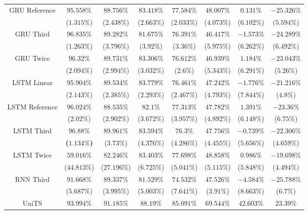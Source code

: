 \begin{table}[!ht]
{\begin{tabular}{|c|c|c|c|c|c|c|c|}
			\multirow{2}{*}{GRU Reference} & $95.558\%$ & $88.756\%$ & $83.418\%$ & $77.584\%$ & $48.007\%$ & $0.131\%$ & $-25.326\%$ \\
			 & ($1.315\%$) & ($2.438\%$) & ($2.663\%$) & ($2.033\%$) & ($4.073\%$) & ($6.102\%$) & ($5.594\%$) \\ \hline
			\multirow{2}{*}{GRU Third} & $96.835\%$ & $89.282\%$ & $81.675\%$ & $76.391\%$ & $46.417\%$ & $-1.573\%$ & $-24.289\%$ \\
			 & ($1.263\%$) & ($3.796\%$) & ($3.92\%$) & ($3.36\%$) & ($5.975\%$) & ($6.262\%$) & ($6.492\%$) \\ \hline
			\multirow{2}{*}{GRU Twice} & $96.32\%$ & $89.731\%$ & $83.306\%$ & $76.612\%$ & $46.939\%$ & $1.184\%$ & $-23.043\%$ \\
			 & ($2.094\%$) & ($2.994\%$) & ($3.032\%$) & ($2.6\%$) & ($5.343\%$) & ($6.291\%$) & ($5.26\%$) \\ \hline
			\multirow{2}{*}{LSTM Linear} & $95.904\%$ & $89.534\%$ & $83.779\%$ & $76.461\%$ & $47.242\%$ & $-1.776\%$ & $-21.216\%$ \\
			 & ($2.143\%$) & ($2.385\%$) & ($2.293\%$) & ($2.467\%$) & ($4.793\%$) & ($7.844\%$) & ($4.8\%$) \\ \hline
			\multirow{2}{*}{LSTM Reference} & $96.024\%$ & $88.535\%$ & $82.1\%$ & $77.313\%$ & $47.782\%$ & $1.391\%$ & $-23.36\%$ \\
			 & ($2.02\%$) & ($2.902\%$) & ($3.672\%$) & ($3.957\%$) & ($4.892\%$) & ($6.148\%$) & ($6.75\%$) \\ \hline
			\multirow{2}{*}{LSTM Third} & $\mathbf{96.88\%}$ & $89.961\%$ & $83.594\%$ & $76.3\%$ & $47.756\%$ & $-0.739\%$ & $-22.306\%$ \\
			 & \textbf{(}$\mathbf{1.134\%}$\textbf{)} & ($3.73\%$) & ($4.376\%$) & ($4.286\%$) & ($4.455\%$) & ($5.656\%$) & ($4.659\%$) \\ \hline
			\multirow{2}{*}{LSTM Twice} & $59.016\%$ & $82.246\%$ & $83.403\%$ & $77.698\%$ & $48.858\%$ & $0.986\%$ & $-19.698\%$ \\
			 & ($44.813\%$) & ($27.196\%$) & ($6.725\%$) & ($5.041\%$) & ($5.115\%$) & ($5.848\%$) & ($4.494\%$) \\ \hline
			\multirow{2}{*}{RNN Third} & $91.668\%$ & $89.337\%$ & $81.529\%$ & $74.532\%$ & $47.526\%$ & $-4.584\%$ & $-25.788\%$ \\
			 & ($5.687\%$) & ($3.995\%$) & ($5.003\%$) & ($7.641\%$) & ($3.91\%$) & ($8.663\%$) & ($6.7\%$) \\ \hline
			\multirow{2}{*}{UniTS} & $93.994\%$ & $91.185\%$ & $\mathbf{88.19\%}$ & $\mathbf{85.091\%}$ & $\mathbf{69.544\%}$ & $42.603\%$ & $23.39\%$ \\

\end{tabular}}
\end{table}

